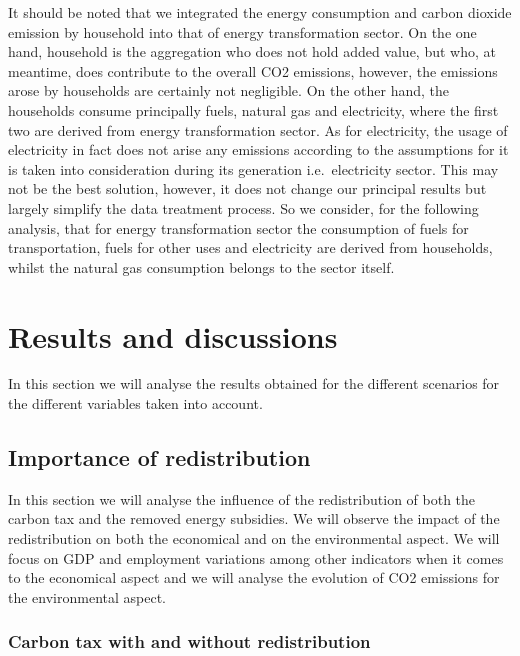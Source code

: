 \documentclass[
]{article}
\begin{document}
It should be noted that we integrated the energy consumption and carbon
dioxide emission by household into that of energy transformation sector.
On the one hand, household is the aggregation who does not hold added
value, but who, at meantime, does contribute to the overall CO2
emissions, however, the emissions arose by households are certainly not
negligible. On the other hand, the households consume principally fuels,
natural gas and electricity, where the first two are derived from energy
transformation sector. As for electricity, the usage of electricity in
fact does not arise any emissions according to the assumptions for it is
taken into consideration during its generation i.e.~electricity sector.
This may not be the best solution, however, it does not change our
principal results but largely simplify the data treatment process. So we
consider, for the following analysis, that for energy transformation
sector the consumption of fuels for transportation, fuels for other uses
and electricity are derived from households, whilst the natural gas
consumption belongs to the sector itself.

\hypertarget{results-and-discussions}{%
\section{Results and discussions}\label{results-and-discussions}}

In this section we will analyse the results obtained for the different
scenarios for the different variables taken into account.

\hypertarget{importance-of-redistribution}{%
\subsection{Importance of
redistribution}\label{importance-of-redistribution}}

In this section we will analyse the influence of the redistribution of
both the carbon tax and the removed energy subsidies. We will observe
the impact of the redistribution on both the economical and on the
environmental aspect. We will focus on GDP and employment variations
among other indicators when it comes to the economical aspect and we
will analyse the evolution of CO2 emissions for the environmental
aspect.

\hypertarget{carbon-tax-with-and-without-redistribution}{%
\subsubsection{Carbon tax with and without
redistribution}\label{carbon-tax-with-and-without-redistribution}}
\end{document}
